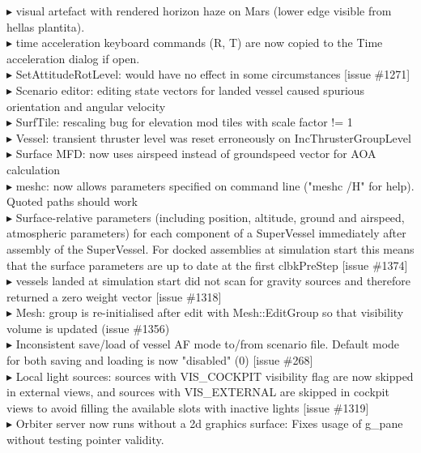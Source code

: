 \documentclass[Orbiter User Manual.tex]{subfiles}
\begin{document}
$\blacktriangleright$ visual artefact with rendered horizon haze on Mars (lower edge visible from hellas plantita).\\
$\blacktriangleright$ time acceleration keyboard commands (R, T) are now copied to the Time acceleration dialog if open.\\
$\blacktriangleright$ SetAttitudeRotLevel: would have no effect in some circumstances [issue \#1271]\\
$\blacktriangleright$ Scenario editor: editing state vectors for landed vessel caused spurious orientation and angular velocity\\
$\blacktriangleright$ SurfTile: rescaling bug for elevation mod tiles with scale factor != 1\\
$\blacktriangleright$ Vessel: transient thruster level was reset erroneously on IncThrusterGroupLevel\\
$\blacktriangleright$ Surface MFD: now uses airspeed instead of groundspeed vector for AOA calculation\\
$\blacktriangleright$ meshc: now allows parameters specified on command line ("meshc /H" for help). Quoted paths should work\\
$\blacktriangleright$ Surface-relative parameters (including position, altitude, ground and airspeed, atmospheric parameters) for each component of a SuperVessel immediately after assembly of the SuperVessel. For docked assemblies at simulation start this means that the surface parameters are up to date at the first clbkPreStep [issue \#1374]\\
$\blacktriangleright$ vessels landed at simulation start did not scan for gravity sources and therefore returned a zero weight vector [issue \#1318]\\
$\blacktriangleright$ Mesh: group is re-initialised after edit with Mesh::EditGroup so that visibility volume is updated (issue \#1356)\\
$\blacktriangleright$ Inconsistent save/load of vessel AF mode to/from scenario file. Default mode for both saving and loading is now "disabled" (0) [issue \#268]\\
$\blacktriangleright$ Local light sources: sources with VIS\_COCKPIT visibility flag are now skipped in external views, and sources with VIS\_EXTERNAL are skipped in cockpit views to avoid filling the available slots with inactive lights [issue \#1319]\\
$\blacktriangleright$ Orbiter server now runs without a 2d graphics surface: Fixes usage of g\_pane without testing pointer validity.\\
\end{document}
